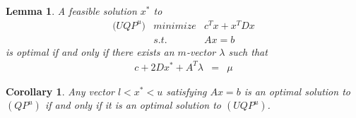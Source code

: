 \documentclass[a4paper]{article}
\newtheorem{lemma}{Lemma}
\newtheorem{cor}{Corollary}
\begin{document}
\begin{lemma}
A feasible solution $x^{*}$ to
\begin{eqnarray}
  \mbox{($UQP^{u}$)} &minimize& c^{T}x +x^{T}Dx
\nonumber      \\
\label{eq:UQP_UB_eq_feas_cons}
    & s.t. & Ax = b
\end{eqnarray}
is optimal if and only if there exists an $m$-vector $\lambda$ such that
\begin{eqnarray}
c + 2Dx^{*} +A^{T}\lambda
&=&
\mu  
\end{eqnarray}
\end{lemma}
\begin{cor}
\label{cor:int_QP_UQP}
Any vector $l<x^{*}<u$ satisfying $Ax=b$ is an optimal solution to $(QP^{u})$
if and only if it is an optimal solution to $(UQP^{u})$.
\end{cor}
\end{document}
